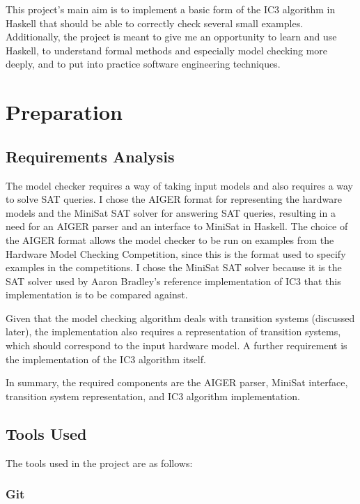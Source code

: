 \documentclass[12pt,a4paper,twoside,openright]{report}
\begin{document}
This project's main aim is to implement a basic form of the IC3 algorithm in
Haskell that should be able to correctly check several
small examples. Additionally, the project is meant to give me an opportunity
to learn and use Haskell, to understand formal methods and especially model
checking more deeply, and to put into practice software engineering techniques.

\chapter{Preparation}

\section{Requirements Analysis}


The model checker requires a way of taking input models and also
requires a way to solve SAT queries.
I chose the AIGER format for representing the hardware models and the
MiniSat SAT solver for answering SAT queries, resulting in a need for an
AIGER parser and an interface to MiniSat in Haskell. The choice of
the AIGER format allows the model checker to be run on examples from
the Hardware Model Checking Competition, since this is the format used
to specify examples in the competitions. I chose the MiniSat SAT
solver because it is the SAT solver used by Aaron Bradley's reference
implementation of IC3 that this implementation is to be compared against.

Given that the model checking algorithm deals with transition systems
(discussed later), the implementation also requires a representation of
transition systems, which should correspond to the input hardware model.
A further requirement is the implementation of the
IC3 algorithm itself.

In summary, the required components are the AIGER parser, MiniSat interface,
transition system representation, and IC3 algorithm implementation.

\section{Tools Used}

The tools used in the project are as follows:

\subsection{Git}
\end{document}
